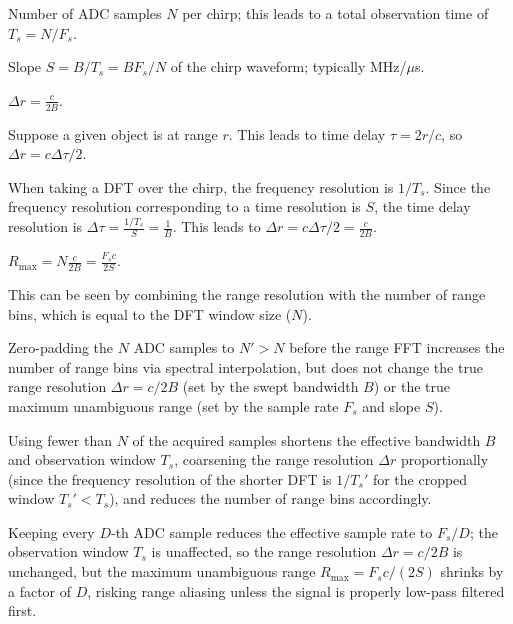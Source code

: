 \begin{definition}
Number of ADC samples $N$ per chirp; this leads to a total observation time of $T_s = N / F_s$.
\end{definition}

\begin{definition}[Slope]
Slope $S = B / T_s = BF_s / N$ of the chirp waveform; typically MHz/$\mu$s.
\end{definition}

\begin{definition}
$\Delta r = \frac{c}{2B}$.
\end{definition}
Suppose a given object is at range $r$. This leads to time delay $\tau = 2r/c$, so $\Delta r = c \Delta \tau / 2$.

When taking a DFT over the chirp, the frequency resolution is $1/T_s$. Since the frequency resolution corresponding to a time resolution is $S$, the time delay resolution is $\Delta \tau = \frac{1/T_s}{S} = \frac{1}{B}$. This leads to $\Delta r = c \Delta \tau / 2 = \frac{c}{2B}$.

\begin{definition}
$R_{\max} = N\frac{c}{2B} = \frac{F_sc}{2S}$.
\end{definition}
This can be seen by combining the range resolution with the number of range bins, which is equal to the DFT window size ($N$).

\begin{remark}[Padding]
Zero-padding the $N$ ADC samples to $N' > N$ before the range FFT increases the number of range bins via spectral interpolation, but does not change the true range resolution $\Delta r = c/2B$ (set by the swept bandwidth $B$) or the true maximum unambiguous range (set by the sample rate $F_s$ and slope $S$).
\end{remark}

\begin{remark}[Cropping]
Using fewer than $N$ of the acquired samples shortens the effective bandwidth $B$ and observation window $T_s$, coarsening the range resolution $\Delta r$ proportionally (since the frequency resolution of the shorter DFT is $1/T_s'$ for the cropped window $T_s' < T_s$), and reduces the number of range bins accordingly.
\end{remark}

\begin{remark}[Decimation]
Keeping every $D$-th ADC sample reduces the effective sample rate to $F_s/D$; the observation window $T_s$ is unaffected, so the range resolution $\Delta r = c/2B$ is unchanged, but the maximum unambiguous range $R_{\max} = F_sc/(2S)$ shrinks by a factor of $D$, risking range aliasing unless the signal is properly low-pass filtered first.
\end{remark}

